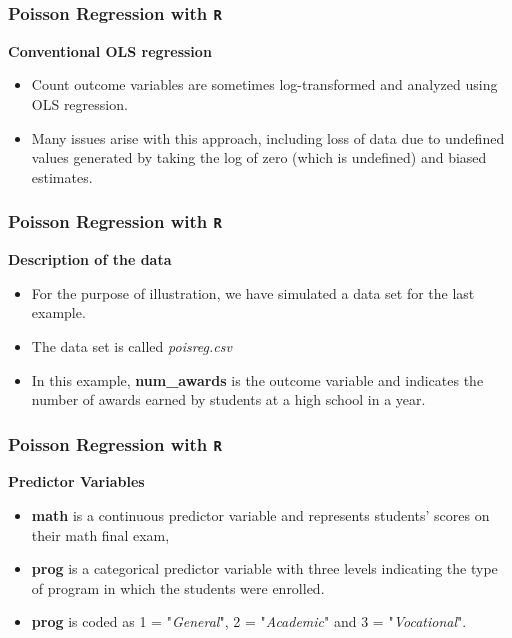 \documentclass[MASTER.tex]{subfiles}
\begin{document}
\begin{frame}[fragile]
	
	\frametitle{Poisson Regression with \texttt{R}}
	\Large
	\textbf{Conventional OLS regression}
	\begin{itemize}
		\item Count outcome variables are sometimes log-transformed and analyzed using OLS regression. 
		\item Many issues arise with this approach, including loss of data due to undefined values generated by taking the log of zero (which is undefined) and biased estimates.
	\end{itemize}
	\bigskip
\end{frame}


\begin{frame}[fragile]

\frametitle{Poisson Regression with \texttt{R}}
\Large
\textbf{Description of the data}

\begin{itemize}
\item For the purpose of illustration, we have simulated a data set for the last example.

\item The data set is called \textit{poisreg.csv}  

\item In this example, \textbf{num\_awards} is the outcome variable and indicates the number of awards earned by students at a high school in a year.

\end{itemize}
\end{frame}
\begin{frame}[fragile]
	
	\frametitle{Poisson Regression with \texttt{R}}
	\Large
	\textbf{Predictor Variables}
\begin{itemize}
\item \textbf{math} is a continuous predictor variable and represents students' scores on their math final exam, \item \textbf{prog} is a categorical predictor variable with three levels indicating the type of program in which the students were enrolled.

\item  \textbf{prog} is coded as 1 = "\textit{General}",
 2 = "\textit{Academic}" and 3 = "\textit{Vocational}". 
\end{itemize}

\end{frame}
\end{document}
